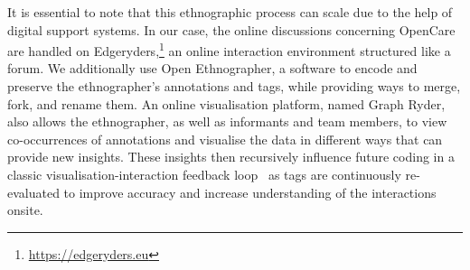 It is essential to note that this ethnographic process can scale due to the help of digital support systems. In our case, the online discussions concerning OpenCare are handled on Edgeryders,\footnote{\url{https://edgeryders.eu}} an online interaction environment structured like a forum. We additionally use Open Ethnographer, a software to encode and preserve the ethnographer's annotations and tags, while providing ways to merge, fork, and rename them. An online visualisation platform, named Graph Ryder, also allows the ethnographer, as well as informants and team members, to view co-occurrences of annotations and visualise the data in different ways that can provide new insights. These insights then recursively influence future coding in a classic visualisation-interaction feedback loop~\cite{Wijk2005} as tags are continuously re-evaluated to improve accuracy and increase understanding of the interactions onsite.
